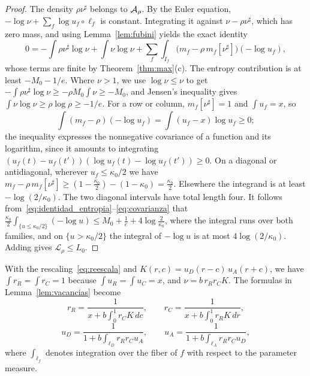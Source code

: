\begin{proof} The density $\rho\nu^\sharp$ belongs to ${\mathcal{A}}_\rho$. By the Euler equation, $-\log\nu+\sum_f\log u_f\circ\ell_f$ is
constant. Integrating it against $\nu-\rho\nu^\sharp$, which has zero mass, and using Lemma~\ref{lem:fubini} yields the exact identity
\begin{equation}\label{eq:identidad_entropia}
 0=-\int\rho\nu^\sharp\log\nu+\int\nu\log\nu+\sum_f\int_{I_f}\bigl(m_f-\rho\,m_f[\nu^\sharp]\bigr)(-\log u_f),
\end{equation} whose terms are finite by Theorem~\ref{thm:max}(c). The entropy contribution is at least $-M_0-1/e$. Where $\nu>1$, we
use $\log\nu\le\nu$ to get $-\int\rho\nu^\sharp\log\nu\ge-\rho M_0\int\nu\ge-M_0$, and Jensen's inequality gives
$\int\nu\log\nu\ge\rho\log\rho\ge-1/e$. For a row or column, $m_f[\nu^\sharp]=1$ and $\int u_f=x$, so
\begin{equation}\label{eq:covarianza}
 \int(m_f-\rho)(-\log u_f)=\int(u_f-x)\log u_f\ge0 ;
\end{equation} the inequality expresses the nonnegative covariance of a function and its logarithm, since it amounts to integrating
$(u_f(t)-u_f(t'))(\log u_f(t)-\log u_f(t'))\ge0$. On a diagonal or antidiagonal, wherever $u_f\le\kappa_0/2$ we have
$m_f-\rho\,m_f[\nu^\sharp]\ge(1-\frac{\kappa_0}2)-(1-\kappa_0)=\frac{\kappa_0}2$. Elsewhere the integrand is at least
$-\log(2/\kappa_0)$. The two diagonal intervals have total length four. It follows
from~\eqref{eq:identidad_entropia}--\eqref{eq:covarianza} that $\frac{\kappa_0}2\int_{\{u\le\kappa_0/2\}}(-\log u)\le
M_0+\frac1e+4\log\frac2{\kappa_0}$, where the integral runs over both families, and on $\{u>\kappa_0/2\}$ the integral of $-\log u$ is
at most $4\log(2/\kappa_0)$. Adding gives $\mathcal L_\rho\le L_0$. \end{proof}

With the rescaling~\eqref{eq:reescala} and $K(r,c)=u_D(r-c)\,u_A(r+c)$, we have $\int r_R=\int r_C=1$ because $\int u_R=\int u_C=x$,
and $\nu=b\,r_Rr_CK$. The formulas in Lemma~\ref{lem:vacancias} become \begin{equation}\label{eq:filas}
 r_R=\frac1{x+b\int_0^1r_CK\,dc},\qquad r_C=\frac1{x+b\int_0^1r_RK\,dr},
\end{equation} \begin{equation}\label{eq:diagonales}
 u_D=\frac1{1+b\int_{\ell_D}r_Rr_Cu_A},\qquad u_A=\frac1{1+b\int_{\ell_A}r_Rr_Cu_D},
\end{equation} where $\int_{\ell_f}$ denotes integration over the fiber of $f$ with respect to the parameter measure.

